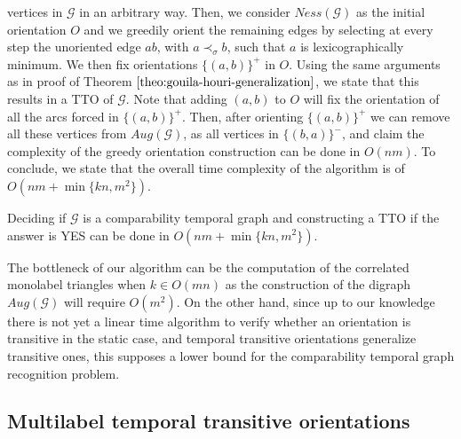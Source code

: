 \documentclass[runningheads]{llncs}
\begin{document}
vertices in $\mathcal{G}$ in an arbitrary way. Then, we consider $Ness(\mathcal{G})$ as the initial orientation $O$ and we greedily orient the remaining edges by selecting at every step the unoriented edge $ab$, with $a \prec_{\sigma} b$, such that $a$ is lexicographically minimum. We then fix orientations $\{(a,b)\}^{+}$ in $O$. Using the same arguments as in proof of Theorem $\ref{theo:gouila-houri-generalization}$, we state that this results in a TTO of $\mathcal{G}$. Note that adding $(a,b)$ to $O$ will fix the orientation of all the arcs forced in $\{(a,b)\}^{+}$. Then, after orienting $\{(a,b)\}^{+}$ we can remove all these vertices from $Aug(\mathcal{G})$, as all vertices in $\{(b,a)\}^{-}$, and claim the complexity of the greedy orientation construction can be done in $O(nm)$. To conclude, we state that the overall time complexity of the algorithm is of $O(nm + \min\{kn,m^2\})$.

\begin{theorem}
Deciding if $\mathcal{G}$ is a comparability temporal graph and constructing a TTO if the answer is YES can be done in $O(nm + \min\{kn,m^2\})$.
\end{theorem}

The bottleneck of our algorithm can be the computation of the correlated monolabel triangles when $k \in O(mn)$ as the construction of the digraph $Aug(\mathcal{G})$ will require $O(m^2)$. On the other hand, since up to our knowledge there is not yet a linear time algorithm to verify whether an orientation is transitive in the static case, and temporal transitive orientations generalize transitive ones, this supposes a lower bound for the comparability temporal graph recognition problem.

\subsection{Multilabel temporal transitive orientations}
\end{document}
